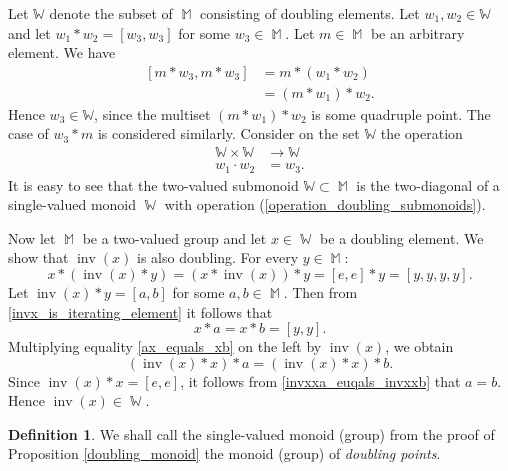 \documentclass[14pt, dvipsnames]{extarticle}
\makeatletter
\theoremstyle{plain}
\theoremstyle{definition}
\newtheorem{defi}{Definition}
\theoremstyle{remark}
\renewenvironment{proof}[1][\proofname]{
  \par\pushQED{\qed}\normalfont
  \topsep6\p@\@plus6\p@\relax
  \trivlist\item[\hskip\labelsep\bfseries\itshape #1\@addpunct{.}]
}{\popQED\endtrivlist\@endpefalse}
\DeclareMathOperator{\inv}{\mathrm{inv}}
\DeclareMathOperator{\M}{\mathbb{M}}
\DeclareMathOperator{\W}{\mathbb{W}}
\makeatother
\begin{document}
\begin{proof}
Let $\mathbb{W}$ denote the subset of $\M$ consisting of doubling elements. Let $w_1, w_2\in\mathbb{W}$ and let $w_1\ast w_2 = [w_3, w_3]$ for some $w_3\in\M$. Let $m\in\M$ be an arbitrary element. We have
$$\begin{aligned}
[m\ast w_3, m\ast w_3] &= m\ast (w_1\ast w_2)\\
&= (m\ast w_1)\ast w_2.
\end{aligned}$$
Hence $w_3\in \mathbb{W}$, since the multiset $(m\ast w_1)\ast w_2$ is some quadruple point. The case of $w_3\ast m$ is considered similarly. Consider on the set $\mathbb{W}$ the operation
\begin{equation}
\begin{aligned}\label{operation_doubling_submonoids}
\mathbb{W}\times \mathbb{W}&\to \mathbb{W}\\
w_1\cdot w_2 &= w_3.
\end{aligned}
\end{equation}
It is easy to see that the two-valued submonoid $\mathbb{W}\subset\M$ is the two-diagonal of a single-valued monoid $\W$ with operation (\ref{operation_doubling_submonoids}).

{Now let $\M$ be a two-valued group and let $x\in \W$ be a doubling element. We show that $\inv(x)$ is also doubling. For every $y\in\M$:
\begin{equation}\label{invx_is_iterating_element}
x\ast(\inv(x)\ast y) = (x\ast \inv(x))\ast y = [e,e]\ast y =  [y,y,y,y].
\end{equation}
Let $\inv(x)\ast y = [a, b]$ for some $a, b\in \M$. Then from \eqref{invx_is_iterating_element} it follows that
\begin{equation}\label{ax_equals_xb}
x\ast a = x\ast b = [y,y].
\end{equation}
Multiplying equality \eqref{ax_equals_xb} on the left by $\inv(x)$, we obtain
\begin{equation}\label{invxxa_euqals_invxxb}
(\inv(x)\ast x)\ast a = (\inv(x)\ast x)\ast b.
\end{equation}
Since $\inv(x)\ast x = [e,e]$, it follows from \eqref{invxxa_euqals_invxxb} that $a = b$. Hence $\inv(x)\in\W$.}
      
\end{proof}

\begin{defi}
We shall call the single-valued monoid (group) from the proof of Proposition \ref{doubling_monoid} the monoid (group) of {\it doubling points}.
\end{defi}
\end{document}
